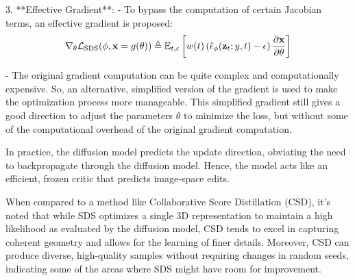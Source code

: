 3. **Effective Gradient**:
   - To bypass the computation of certain Jacobian terms, an effective gradient is proposed:
     \[ \nabla_{\theta}\mathcal{L}_{\text{SDS}}(\phi,\mathbf{x}=g(\theta))\triangleq\mathbb{E}_{t,\epsilon}\left[w(t)\left(\hat{\epsilon}_{\phi}({\mathbf{z}}_{t};y,t)-\epsilon\right){\partial\mathbf{x}\over\partial\theta}\right] \]

    - The original gradient computation can be quite complex and computationally expensive. So, an alternative, simplified version of the gradient is used to make the optimization process more manageable. This simplified gradient still gives a good direction to adjust the parameters \( \theta \) to minimize the loss, but without some of the computational overhead of the original gradient computation.


In practice, the diffusion model predicts the update direction, obviating the need to backpropagate through the diffusion model. Hence, the model acts like an efficient, frozen critic that predicts image-space edits.

When compared to a method like Collaborative Score Distillation (CSD), it's noted that while SDS optimizes a single 3D representation to maintain a high likelihood as evaluated by the diffusion model, CSD tends to excel in capturing coherent geometry and allows for the learning of finer details. Moreover, CSD can produce diverse, high-quality samples without requiring changes in random seeds, indicating some of the areas where SDS might have room for improvement.

